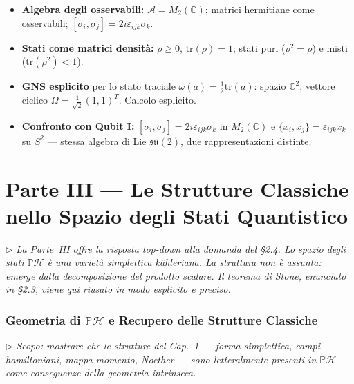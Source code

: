 \documentclass[12pt, a4paper]{article}
\newcommand{\nota}[1]{%
	\par\smallskip
	\noindent\textit{\small $\triangleright$\; #1}
	\par\smallskip
}
\begin{document}
	\begin{itemize}
		\item \textbf{Algebra degli osservabili:} $\mathcal{A}=M_2(\mathbb{C})$; matrici
		hermitiane come osservabili; $[\sigma_i,\sigma_j]=2i\varepsilon_{ijk}\sigma_k$.
		\item \textbf{Stati come matrici densità:} $\rho\geq 0$, $\mathrm{tr}(\rho)=1$;
		stati puri ($\rho^2=\rho$) e misti ($\mathrm{tr}(\rho^2)<1$).
		\item \textbf{GNS esplicito} per lo stato traciale $\omega(a)=\frac{1}{2}
		\mathrm{tr}(a)$: spazio $\mathbb{C}^2$, vettore ciclico $\Omega=\frac{1}{\sqrt{2}}
		(1,1)^T$. Calcolo esplicito.
		\item \textbf{Confronto con Qubit I:} $[\sigma_i,\sigma_j]=2i\varepsilon_{ijk}
		\sigma_k$ in $M_2(\mathbb{C})$ e $\{x_i,x_j\}=\varepsilon_{ijk}x_k$ su $S^2$
		--- stessa algebra di Lie $\mathfrak{su}(2)$, due rappresentazioni distinte.
	\end{itemize}
	
	\newpage
	\part*{Parte III --- Le Strutture Classiche nello Spazio degli Stati Quantistico}
	
	\nota{La Parte~III offre la risposta top-down alla domanda del \S2.4. Lo spazio degli
		stati $\mathbb{P}\mathcal{H}$ è una varietà simplettica kähleriana. La struttura
		non è assunta: emerge dalla decomposizione del prodotto scalare. Il teorema di
		Stone, enunciato in \S2.3, viene qui riusato in modo esplicito e preciso.}
	
	\section{Geometria di $\mathbb{P}\mathcal{H}$ e Recupero delle Strutture Classiche}
	
	\nota{Scopo: mostrare che le strutture del Cap.~1 --- forma simplettica, campi
		hamiltoniani, mappa momento, Noether --- sono letteralmente presenti in
		$\mathbb{P}\mathcal{H}$ come conseguenze della geometria intrinseca.}
	
\end{document}
